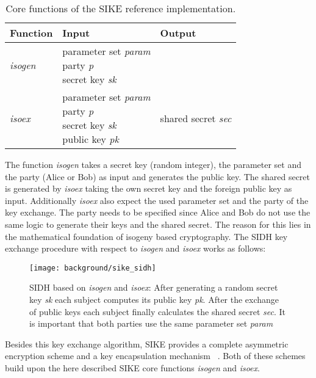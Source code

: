 \begin{table}[H]
  \centering
  \begin{tabular}{|K{3cm}|K{4cm}|K{4cm}|}
	\hline
      \textbf{Function} & \textbf{Input} & \textbf{Output} \\
	\hline
      \textit{isogen} & \parbox[t]{4cm}{\centering parameter set \textit{param}\\party \textit{p}\\ secret key \textit{sk}} &  \\
     \hline
      \textit{isoex} & \parbox[t]{4cm}{\centering parameter set \textit{param}\\party \textit{p}\\ secret key \textit{sk}\\ public key \textit{pk}} & shared secret \textit{sec}\\
     \hline
  \end{tabular}
   \caption[Core functions of the \gls{SIKE} reference implementation]{Core functions of the \gls{SIKE} reference implementation.}\label{tab:sike_core_functions}
\end{table}
The function \textit{isogen} takes a secret key (random integer), the parameter set and the party (Alice or Bob) as input and generates the public key. The shared secret is generated by \textit{isoex} taking the own secret key and the foreign public key as input. Additionally \textit{isoex} also expect the used parameter set and the party of the key exchange. The party needs to be specified since Alice and Bob do not use the same logic to generate their keys and the shared secret. The reason for this lies in the mathematical foundation of isogeny based cryptography. The \gls{SIDH} key exchange procedure with respect to \textit{isogen} and \textit{isoex} works as follows:
\begin{figure}[H]
  \centering
  \texttt{[image: background/sike\_sidh]}
  \caption[\gls{SIDH} based on \textit{isogen} and \textit{isoex}]{\gls{SIDH} based on \textit{isogen} and \textit{isoex}: After generating a random secret key \textit{sk} each subject computes its public key \textit{pk}. After the exchange of public keys each subject finally calculates the shared secret \textit{sec}. It is important that both parties use the same parameter set \textit{param}} \label{fig:sike-sidh}
\end{figure}
Besides this key exchange algorithm, \gls{SIKE} provides a complete asymmetric encryption scheme  and a key encapsulation mechanism  ~\parencite{sike2020spec}. Both of these schemes build upon the here described \gls{SIKE} core functions \textit{isogen} and \textit{isoex}.

